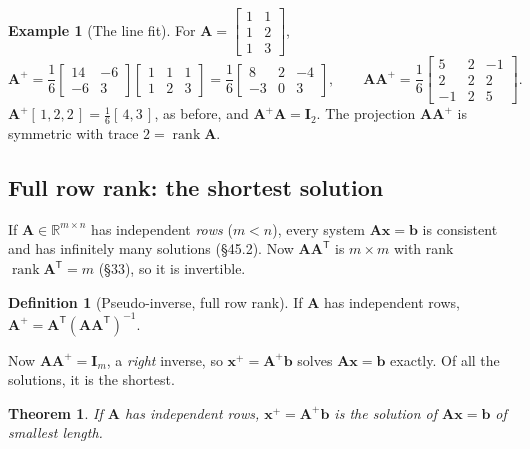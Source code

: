 \documentclass[11pt]{article}
\theoremstyle{plain}
\newtheorem{thm}{Theorem}[section]
\theoremstyle{definition}
\newtheorem{defn}{Definition}[section]
\newtheorem{ex}{Example}[section]
\theoremstyle{remark}
\newcommand{\R}{\mathbb{R}}
\newcommand{\vc}[1]{\mathbf{#1}}
\newcommand{\mt}[1]{\mathbf{#1}}
\newcommand{\T}{^{\mathsf{T}}}
\DeclareMathOperator{\rank}{rank}
\begin{document}
\begin{ex}[The line fit]
For $\mt{A}=\begin{bmatrix}1&1\\1&2\\1&3\end{bmatrix}$,
\[
  \mt{A}^{+}=\frac16\begin{bmatrix}14&-6\\-6&3\end{bmatrix}\begin{bmatrix}1&1&1\\1&2&3\end{bmatrix}
  =\frac16\begin{bmatrix}8&2&-4\\-3&0&3\end{bmatrix},
  \qquad
  \mt{A}\mt{A}^{+}=\frac16\begin{bmatrix}5&2&-1\\2&2&2\\-1&2&5\end{bmatrix}.
\]
$\mt{A}^{+}[\,1,2,2\,]=\frac16[\,4,3\,]$, as before, and $\mt{A}^{+}\mt{A}=\mt{I}_2$.
The projection $\mt{A}\mt{A}^{+}$ is symmetric with trace $2=\rank\mt{A}$.
\end{ex}

\subsection{Full row rank: the shortest solution}
If $\mt{A}\in\R^{m\times n}$ has independent \emph{rows} ($m<n$), every system
$\mt{A}\vc{x}=\vc{b}$ is consistent and has infinitely many solutions (\S45.2). Now
$\mt{A}\mt{A}\T$ is $m\times m$ with rank $\rank\mt{A}\T=m$ (\S33), so it is
invertible.

\begin{defn}[Pseudo-inverse, full row rank]
If $\mt{A}$ has independent rows, $\mt{A}^{+}=\mt{A}\T(\mt{A}\mt{A}\T)^{-1}$.
\end{defn}

\noindent Now $\mt{A}\mt{A}^{+}=\mt{I}_m$, a \emph{right} inverse, so
$\vc{x}^{+}=\mt{A}^{+}\vc{b}$ solves $\mt{A}\vc{x}=\vc{b}$ exactly. Of all the
solutions, it is the shortest.

\begin{thm}
\label{thm:minnorm}
If $\mt{A}$ has independent rows, $\vc{x}^{+}=\mt{A}^{+}\vc{b}$ is the solution
of $\mt{A}\vc{x}=\vc{b}$ of smallest length.
\end{thm}
\end{document}
